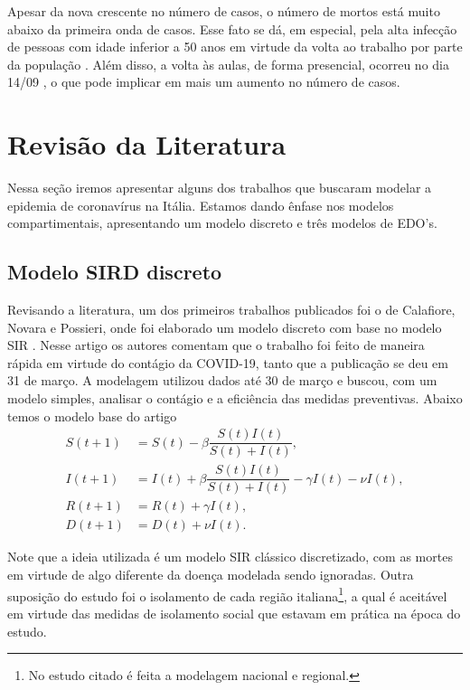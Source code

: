 \documentclass{article}
\begin{document}
Apesar da nova crescente no número de casos, o número de mortos está muito abaixo da primeira onda de casos. Esse fato se dá, em especial, pela alta infecção de pessoas com idade inferior a 50 anos \cite{istoe_idade} em virtude da volta ao trabalho por parte da população \cite{folha_trabalho}. Além disso, a volta às aulas, de forma presencial, ocorreu no dia 14/09 \cite{uol_aulas}, o que pode implicar em mais um aumento no número de casos.

\section{Revisão da Literatura}

Nessa seção iremos apresentar alguns dos trabalhos que buscaram modelar a epidemia de coronavírus na Itália. Estamos dando ênfase nos modelos compartimentais, apresentando um modelo discreto e três modelos de EDO's.

\subsection{Modelo SIRD discreto}

Revisando a literatura, um dos primeiros trabalhos publicados foi o de Calafiore, Novara e Possieri, onde foi elaborado um modelo discreto com base no modelo SIR \cite{calafiore2020modified}. Nesse artigo os autores comentam que o trabalho foi feito de maneira rápida em virtude do contágio da COVID-19, tanto que a publicação se deu em 31 de março. A modelagem utilizou dados até 30 de março e buscou, com um modelo simples, analisar o contágio e a eficiência das medidas preventivas. Abaixo temos o modelo base do artigo
\begin{equation*}
    \begin{split}
        S(t + 1) & = S(t) - \beta \dfrac{S(t) I(t)}{S(t) + I(t)}, \\
        I(t + 1) & = I(t) + \beta \dfrac{S(t) I(t)}{S(t) + I(t)} - \gamma I(t) - \nu I(t), \\
        R(t + 1) & = R(t) + \gamma I(t), \\
        D(t + 1) & = D(t) + \nu I(t).
    \end{split}
\end{equation*}

Note que a ideia utilizada é um modelo SIR clássico discretizado, com as mortes em virtude de algo diferente da doença modelada sendo ignoradas. Outra suposição do estudo foi o isolamento de cada região italiana\footnote{No estudo citado é feita a modelagem nacional e regional.}, a qual é aceitável em virtude das medidas de isolamento social que estavam em prática na época do estudo.
\end{document}
